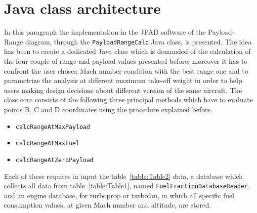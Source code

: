 \section{Java class architecture}
In this paragraph the implementation in the \gls{JPAD} software of the Payload-Range diagram, through the \lstinline[language=Java]!PayloadRangeCalc! Java class, is presented. The idea has been to create a dedicated Java class which is demanded of the calculation of the four couple of range and payload values presented before; moreover it has to confront the user chosen Mach number condition with the best range one and to parametrize the analysis at different maximum take-off weight in order to help users making design decisions about different version of the same aircraft.
%
The class core consists of the following three principal methods which have to evaluate points B, C and D coordinates using the procedure explained before.
%
\begin{itemize}
\item\lstinline[language=Java]!calcRangeAtMaxPayload!
\item\lstinline[language=Java]!calcRangeAtMaxFuel!
\item\lstinline[language=Java]!calcRangeAtZeroPayload!
\end{itemize}
%
\noindent
Each of these requires in input the table~\ref{table:Table2} data, a database which collects all data from table~\ref{table:Table1},  named \lstinline[language=Java]!FuelFractionDatabaseReader!, and an engine database, for turboprop or turbofan, in which all specific fuel consumption values, at given Mach number and altitude, are stored.
%
